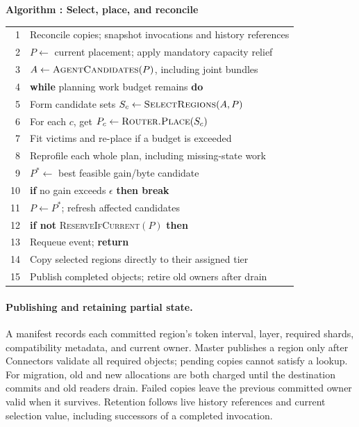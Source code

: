 \par\medskip\noindent\begin{minipage}{\columnwidth}
\raggedright
{}\label{alg:protection}
\textbf{Algorithm \thedesignalgorithm: Select, place, and reconcile}
\par\smallskip
\begin{tabularx}{\columnwidth}{@{}r@{\quad}X@{}}
\toprule
1 & Reconcile copies; snapshot invocations and history references \\
2 & $P\gets$ current placement; apply mandatory capacity relief \\
3 & $A\gets\textsc{AgentCandidates}(P)$, including joint bundles \\
4 & \textbf{while} planning work budget remains \textbf{do} \\
5 & \quad Form candidate sets $S_c\gets\textsc{SelectRegions}(A,P)$ \\
6 & \quad For each $c$, get $P_c\gets\textsc{Router.Place}(S_c)$ \\
7 & \quad Fit victims and re-place if a budget is exceeded \\
8 & \quad Reprofile each whole plan, including missing-state work \\
9 & \quad $P^*\gets$ best feasible gain/byte candidate \\
10 & \quad \textbf{if} no gain exceeds $\epsilon$ \textbf{then break} \\
11 & \quad $P\gets P^*$; refresh affected candidates \\
12 & \textbf{if not} \textsc{ReserveIfCurrent}$(P)$ \textbf{then} \\
13 & \quad Requeue event; \textbf{return} \\
14 & Copy selected regions directly to their assigned tier \\
15 & Publish completed objects; retire old owners after drain \\
\bottomrule
\end{tabularx}
\end{minipage}\par\medskip

\paragraph{Publishing and retaining partial state.}
A manifest records each committed region's token interval, layer,
required shards, compatibility metadata, and current owner. Master
publishes a region only after Connectors validate all required objects;
pending copies cannot satisfy a lookup. For migration, old and new
allocations are both charged until the destination commits and old
readers drain. Failed copies leave the previous committed owner valid
when it survives. Retention follows live history references and current
selection value, including successors of a completed invocation.

